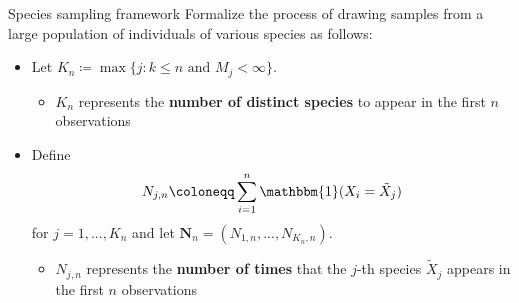 \documentclass[11pt]{beamer}
\begin{document}
\begin{frame}[t]{Species sampling framework}
    Formalize the process of drawing samples from a large population of individuals of various species as follows:
    \begin{itemize}
        \item<1-> Let \(K_n \coloneqq \max\{j \colon k \leq n \text{ and } M_j < \infty\}\).
        \begin{itemize}
            \item \(K_n\) represents the \textbf{number of distinct species} to appear in the first \(n\) observations
        \end{itemize}
        \item<2-> Define
        \begin{equation*}
            N_{j,n} \coloneqq \sum_{i=1}^n \mathbbm{1}(X_i = \tilde{X}_j)
        \end{equation*}
        for \(j = 1,...,K_n\) and let \(\mathbf{N}_{n} = (N_{1,n},...,N_{K_n,n})\).
        \begin{itemize}
            \item \(N_{j,n}\) represents the \textbf{number of times} that the \(j\)-th species \(\tilde{X}_j\) appears in the first \(n\) observations
        \end{itemize}
    \end{itemize}
\end{frame}
\end{document}
